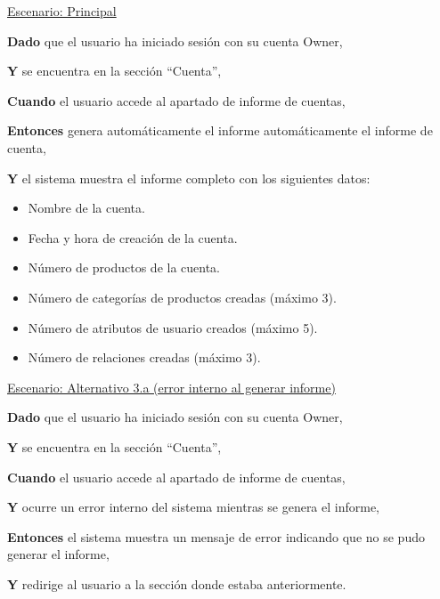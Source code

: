 \underline{Escenario: Principal}\par
\vspace{0.15cm}
\textbf{Dado} que el usuario ha iniciado sesión con su cuenta Owner,\par
\textbf{Y} se encuentra en la sección \enquote{Cuenta},\par
\textbf{Cuando} el usuario accede al apartado de informe de cuentas,\par
\textbf{Entonces} genera automáticamente el informe automáticamente el informe de cuenta,\par 
\textbf{Y} el sistema muestra el informe completo con los siguientes datos:\par
\begin{itemize}
    \item Nombre de la cuenta.
    \item Fecha y hora de creación de la cuenta.
    \item Número de productos de la cuenta.
    \item Número de categorías de productos creadas (máximo 3).
    \item Número de atributos de usuario creados (máximo 5).
    \item Número de relaciones creadas (máximo 3).
\end{itemize}
\vspace{0.20cm}


\underline{Escenario: Alternativo 3.a (error interno al generar informe)}\par
\vspace{0.15cm}
\textbf{Dado} que el usuario ha iniciado sesión con su cuenta Owner,\par
\textbf{Y} se encuentra en la sección \enquote{Cuenta},\par
\textbf{Cuando} el usuario accede al apartado de informe de cuentas,\par 
\textbf{Y} ocurre un error interno del sistema mientras se genera el informe,\par
\textbf{Entonces} el sistema muestra un mensaje de error indicando que no se pudo generar el informe,\par
\textbf{Y} redirige al usuario a la sección donde estaba anteriormente.\par
\vspace{0.20cm}

\newpage %

